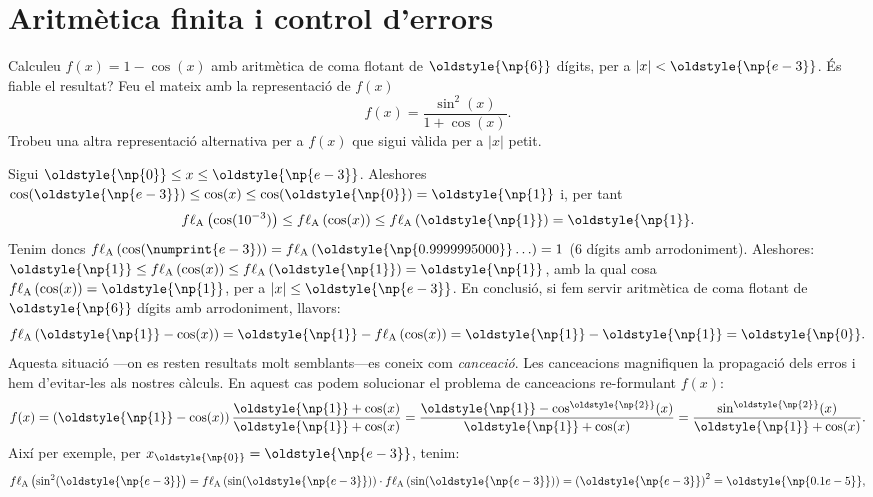 \documentclass[a4paper,twoside,12pt]{exam}
\newcommand{\osnp}[1]{\oldstyle{\np{#1}}}
\begin{document}
\section{Aritmètica finita i control d'errors}

\begin{questions}
\question\label{prob:1}
Calculeu $f(x) = 1 - \cos(x)$ amb aritmètica de coma flotant de $\osnp{6}$
dígits, per a $|x| < \osnp{e-3}$. És fiable el resultat? Feu el mateix amb la
representació de $f(x)$ 
\begin{displaymath}
	f(x) = \frac{\sin^{2}(x)}{1 + \cos(x)}.
\end{displaymath}
Trobeu una altra representació alternativa per a $f(x)$ que sigui vàlida per a
$|x|$ petit.
\begin{solution}
	Sigui $\osnp{0}\le x \le \osnp{e-3}$. Aleshores $\cos(\osnp{e-3})\le\cos(x)
	\le \cos(\osnp{0}) = \osnp{1}$ i, per tant
\begin{displaymath}
	\fl{A}{\cos(10^{-3})}
	\le \fl{A}{\cos(x)} \le \fl{A}{\osnp{1}} = \osnp{1}.
\end{displaymath}
Tenim doncs $\fl{A}{\cos(\numprint{e-3})} = \fl{A}{\osnp{0.9999995000}\ldots} = 1$
(6 dígits amb arrodoniment). Aleshores: $\osnp{1}\le\fl{A}{\cos(x)}\le\fl{A}{\osnp{1}} =
\osnp{1}$, amb la qual cosa $\fl{A}{\cos(x)} = \osnp{1}$, per a $|x|\le\osnp{e-3}$. En
conclusió, si fem servir aritmètica de coma flotant de $\osnp{6}$ dígits amb
arrodoniment, llavors:
\begin{displaymath}
	\fl{A}{\osnp{1}-\cos(x)} = \osnp{1} -\fl{A}{\cos(x)} = 
	\osnp{1} - \osnp{1} = \osnp{0}.
\end{displaymath}
Aquesta situació ---on es resten resultats molt semblants---es coneix com
\emph{cance\lgem ació}. Les cance\lgem acions magnifiquen la propagació dels
erros i hem d'evitar-les als nostres càlculs. En aquest cas podem solucionar el
problema de cance\lgem acions re-formulant $f(x)$:
\begin{displaymath}
	f(x) = \left(\osnp{1}-\cos(x)\right)\frac{\osnp{1}+\cos(x)}%
	{\osnp{1} + \cos(x)}
	= \frac{\osnp{1}-\cos^{\osnp{2}}(x)}{\osnp{1}+\cos(x)} 
	= \frac{\sin^{\osnp{2}}(x)}{\osnp{1}+\cos(x)}.
\end{displaymath}
Així per exemple, per $x_{\osnp{0}} = \osnp{e-3}$, tenim:
\begin{align*}
	\fl{A}{\sin^{2}(\osnp{e-3}} &= \fl{A}{\sin(\osnp{e-3})}\cdot
	\fl{A}{\sin(\osnp{e-3})} = \left(\osnp{e-3}\right)^{2} = \osnp{0.1e-5},\\

\end{align*}
\end{solution}
\end{questions}
\end{document}
